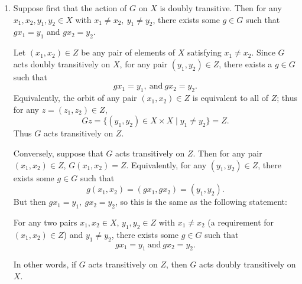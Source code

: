 \documentclass{homework}
\begin{document}
\begin{solution}
  \begin{enumerate}[label=(\alph*)]
    \item Suppose first that the action of $G$ on $X$ is doubly transitive. Then for any
      $x_1,x_2,y_1,y_2\in X$ with $x_1\neq x_2,\ y_1\neq y_2$, there exists some $g\in G$ such that
      $gx_1=y_1$ and $gx_2=y_2$.

      Let $(x_1,x_2)\in Z$ be any pair of elements of $X$ satisfying $x_1\neq x_2$. Since $G$ acts
      doubly transitively on $X$, for any pair $(y_1,y_2)\in Z$, there exists a $g\in G$ such that
      \[
        gx_1=y_1, ~\text{and}~gx_2=y_2
      .\] Equivalently, the orbit of any pair $(x_1,x_2)\in Z$ is equivalent to all of $Z$; thus for
      any $z=(z_1,z_2)\in Z$, \[
        Gz=\{ (y_1,y_2)\in X\times X\mid y_1\neq y_2 \}=Z
      .\] Thus $G$ acts transitively on $Z$.

      Conversely, suppose that $G$ acts transitively on $Z$. Then for any pair $(x_1,x_2)\in Z$,
      $G(x_1,x_2)=Z$. Equivalently, for any $(y_1,y_2)\in Z$, there exists some $g\in G$ such that
      \[
        g(x_1,x_2)=(gx_1,gx_2)=(y_1,y_2)
      .\] But then $gx_1=y_1,\ gx_2=y_2$, so this is the same as the following statement:
      \begin{center}
        For any two pairs $x_1,x_2\in X$, $y_1,y_2\in Z$ with $x_1\neq x_2$ (a requirement
        for $(x_1,x_2)\in Z$) and $y_1\neq y_2$, there exists some $g\in G$ such that \[
          gx_1=y_1~\text{and}~gx_2=y_2
        .\] 
      \end{center}
      In other words, if $G$ acts transitively on $Z$, then $G$ acts doubly transitively on $X$.


\end{enumerate}
\end{solution}
\end{document}
